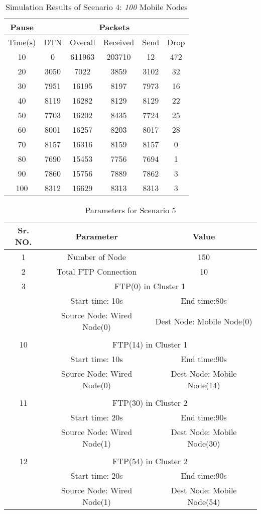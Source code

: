 \documentclass[3p,times]{elsarticle}
\begin{document}
\begin{table}[t!]
\centering
\caption{Simulation Results of Scenario 4: \emph{100} Mobile Nodes}
\label{t10}
\begin{tabular}{|c|c|c|c|c|c|}
\hline
Pause  & \multicolumn{5}{c|}{Packets} \\
\hline
Time(s) & DTN   & Overall & Received & Send & Drop \\
\hline
10 & 0 & 611963 & 203710 & 12 & 472\\
20 & 3050 & 7022 & 3859 & 3102 & 32\\
30 & 7951 & 16195 & 8197 & 7973 & 16\\
40 & 8119 & 16282 & 8129 & 8129 & 22\\
50 & 7703 & 16202 & 8435 & 7724 & 25\\
60 & 8001 & 16257 & 8203 & 8017 & 28\\
70 & 8157 & 16316 & 8159 & 8157 & 0\\
80 & 7690 & 15453 & 7756 & 7694 & 1\\
90 & 7860 & 15756 & 7889 & 7862 & 3\\
100 & 8312 & 16629 & 8313 & 8313 & 3\\
\hline
\end{tabular}
\end{table}


\begin{table}[t]
\centering
\caption{Parameters for Scenario 5}
\label{t11}
\begin{tabular}{|c|c|c|}
\hline
Sr. NO. & Parameter & Value \\
\hline
1 & Number of Node & 150 \\
2& Total FTP Connection & 10 \\
\hline
3 & \multicolumn{2}{|c|}{ FTP(0) in Cluster 1} \\
 & Start time: 10s &  End time:80s\\
 & Source Node: Wired Node(0) & Dest Node: Mobile Node(0) \\
 &  &  \\
\hline
10 & \multicolumn{2}{|c|}{ FTP(14) in Cluster 1} \\
 & Start time: 10s &  End time:90s\\
 & Source Node: Wired Node(0) & Dest Node: Mobile Node(14) \\
\hline
 &  &  \\
\hline
11 & \multicolumn{2}{|c|}{ FTP(30) in Cluster 2} \\
 & Start time: 20s &  End time:90s\\
 & Source Node: Wired Node(1) & Dest Node: Mobile Node(30) \\
\hline
 &  &  \\
\hline
12 & \multicolumn{2}{|c|}{ FTP(54) in Cluster 2} \\
 & Start time: 20s &  End time:90s\\
 & Source Node: Wired Node(1) & Dest Node: Mobile Node(54) \\
\hline
\end{tabular}
\end{table}
\end{document}
